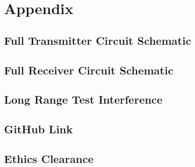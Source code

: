 \documentclass[class=report,11pt,crop=false]{standalone}
\begin{document}
\chapter{Appendix \label{ch:appendix}}

\cite{christian_wolff_physical_2024}
\section{Full Transmitter Circuit Schematic}\label{appendix:fulltransmitterschematic}


\section{Full Receiver Circuit Schematic}\label{appendix:fullreceiverschematic}


\section{Long Range Test Interference}\label{appendix:longrangetestinterferance}

\section{GitHub Link}\label{appendix:githublink}

\section{Ethics Clearance}\label{sec:ethicsclearance}


\ifstandalone

\printnoidxglossary[type=\acronymtype,nonumberlist]
\fi
\end{document}
